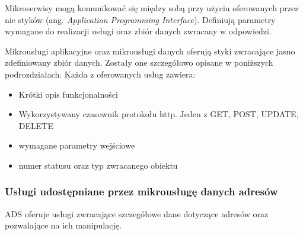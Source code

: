 Mikroserwisy mogą komunikować się między sobą przy użyciu oferowanych przez nie 
styków (ang. \textit{Application Programming Interface}). Definiują parametry wymagane 
do realizacji usługi oraz zbiór danych zwracany w odpowiedzi.

Mikrousługi aplikacyjne oraz mikrousługi danych oferują styki zwracające jasno 
zdefiniowany zbiór danych. Zostały one szczegółowo opisane w poniższych podrozdziałach. 
Każda z oferowanych usług zawiera:

\begin{itemize} %
    \item Krótki opis funkcjonalności
    \item Wykorzystywany czasownik protokołu http. Jeden z GET, POST, UPDATE, DELETE
    \item wymagane parametry wejściowe
    \item numer statusu oraz typ zwracanego obiektu
\end{itemize}

\subsubsection{Usługi udostępniane przez mikrousługę danych adresów}

ADS oferuje usługi zwracające szczegółowe dane dotyczące adresów oraz pozwalające
na ich manipulację.

